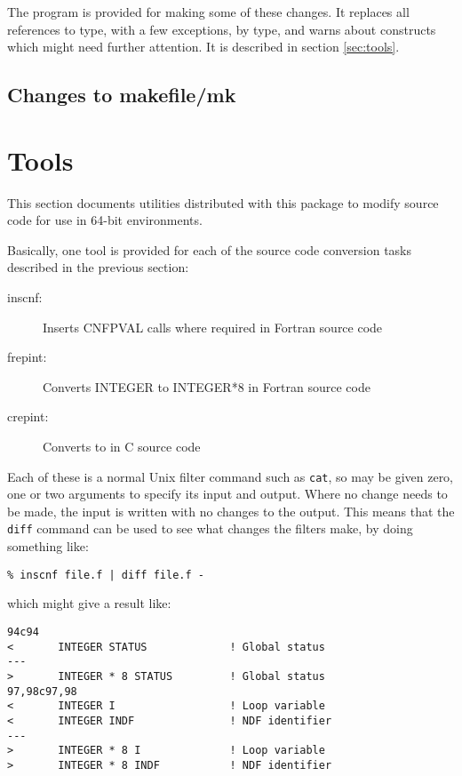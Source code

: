 \documentclass[twoside,11pt]{article}
\renewcommand{\_}{\texttt{\symbol{95}}}
\begin{document}
The program  is provided for making some of these
changes.  It replaces all references to  type, with a few exceptions,
by \cc{INT\_BIG} type, and warns about constructs which might need further
attention.
It is described in section \ref{sec:tools}.


\subsection{Changes to makefile/mk}





\section{Tools\label{sec:tools}}

This section documents utilities distributed with this package
to modify source code for use in 64-bit environments.

Basically, one tool is provided for each of the source code conversion
tasks described in the previous section:
\begin{description}
\item[inscnf:] Inserts CNF\_PVAL calls where required in Fortran source code
\item[frepint:] Converts INTEGER to INTEGER*8 in Fortran source code
\item[crepint:] Converts  to \cc{INT\_BIG} in C source code
\end{description}
Each of these is a normal Unix filter command such as {\tt cat}, 
so may be given zero, one or two arguments to specify its input and output.
Where no change needs to be made, the input is written with no changes 
to the output.  This means that the {\tt diff} command can be used 
to see what changes the filters make, by doing something like:
\begin{squote}
\begin{verbatim}
% inscnf file.f | diff file.f -
\end{verbatim}
\end{squote}
which might give a result like:
\begin{squote}
\begin{verbatim}
94c94
<       INTEGER STATUS             ! Global status
---
>       INTEGER * 8 STATUS         ! Global status
97,98c97,98
<       INTEGER I                  ! Loop variable
<       INTEGER INDF               ! NDF identifier
---
>       INTEGER * 8 I              ! Loop variable
>       INTEGER * 8 INDF           ! NDF identifier
\end{verbatim}
\end{squote}
\end{document}
